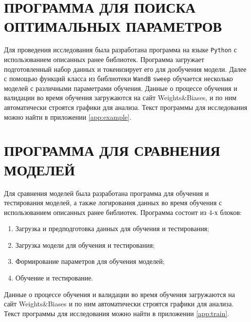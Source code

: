 \section{ПРОГРАММА ДЛЯ ПОИСКА ОПТИМАЛЬНЫХ ПАРАМЕТРОВ}
Для проведения исследования была разработана программа на языке \texttt{Python} с использованием описанных ранее библиотек. Программа 
загружает подготовленный набор данных и токенизирует его для дообучения модели. Далее с помощью функций класса из библиотеки \texttt{WandB} 
\texttt{sweep} обучается несколько моделей с различными параметрами обучения. Данные о процессе обучения и валидации во время обучения 
загружаются на сайт Weights\&Biases, и по ним автоматически строятся графики для анализа. Текст программы для исследования можно 
найти в приложении \ref{app:example}.

\section{ПРОГРАММА ДЛЯ СРАВНЕНИЯ МОДЕЛЕЙ}
Для сравнения моделей была разработана программа для обучения и тестирования моделей, а также логирования данных во время обучения 
с использованием описанных ранее библиотек. Программа состоит из 4-х блоков:
\begin{enumerate}
   \item Загрузка и предподготовка данных для обучения и тестирования;
   \item Загрузка модели для обучения и тестирования;
   \item Формирование параметров для обучения моделей;
   \item Обучение и тестирование.
\end{enumerate}

Данные о процессе обучения и валидации во время обучения загружаются на сайт Weights\&Biases и по ним автоматически строятся графики для анализа. Текст программы для исследования можно найти в приложении \ref{app:train}.